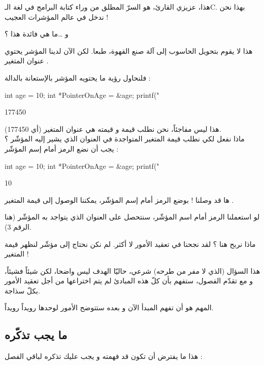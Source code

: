 هذا، عزيزي القارئ، هو السرّ المطلق من وراء كتابة البرامج في لغة الـ\textenglish{C}.
بهذا نحن ندخل في عالم المؤشرات العجيب !
\begin{question}
	و \dots ما هي فائدة هذا ؟
\end{question}
هذا لا يقوم بتحويل الحاسوب إلى آلة صنع القهوة، طبعا. لكن الآن لدينا المؤشر
يحتوي عنوان المتغير
.

فلنحاول رؤية ما يحتويه المؤشر بالإستعانة بالدالة
 :
\begin{Csource}
int age = 10;
int *PointerOnAge = &age;
printf("%
\end{Csource}
\begin{Console}
177450
\end{Console}
هذا ليس مفاجئاً، نحن نطلب قيمة
و قيمته هي عنوان المتغير
(أي 177450).\\
ماذا نفعل لكي نطلب قيمة المتغير المتواجدة في العنوان الذي يشير إليه المؤشّر
؟ يجب أن نضع الرمز
\InlineCode{*}
أمام إسم المؤشّر :
\begin{Csource}
int age = 10;
int *PointerOnAge = &age;
printf("%
\end{Csource}
\begin{Console}
10
\end{Console}
ها قد وصلنا ! بوضع الرمز
\InlineCode{*}
أمام إسم المؤشّر، يمكننا الوصول إلى قيمة المتغير
.

لو استعملنا الرمز
\InlineCode{\&}
أمام اسم المؤشّر، سنتحصل على العنوان الذي يتواجد به المؤشّر (هنا الرقم 3).

\begin{question}
	ماذا نربح هنا ؟ لقد نجحنا في تعقيد الأمور لا أكثر. لم نكن نحتاج إلى مؤشّر لنظهر قيمة المتغير
 !
\end{question}

هذا السؤال (الذي لا مفر من طرحه) شرعي، حاليّا الهدف ليس واضحا، لكن شيئاً فشيئاً، و مع تقدّم الفصول، ستفهم بأن كلّ هذه المبادئ لم يتم اختراعها من أجل تعقيد الأمور بكلّ سذاجة.

المهم هو أن تفهم المبدأ الآن و بعده ستتوضح الأمور لوحدها رويداً رويداً.

\subsection{ما يجب تذكّره}

هذا ما يفترض أن تكون قد فهمته و يجب عليك تذكره لباقي الفصل :

